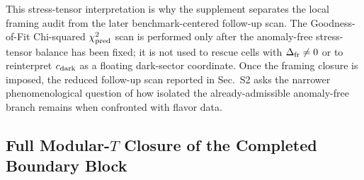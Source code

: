 \documentclass[11pt]{article}
\begin{document}
This stress-tensor interpretation is why the supplement separates the local framing audit from the later benchmark-centered follow-up scan. The Goodness-of-Fit Chi-squared $\chi^2_{\rm pred}$ scan is performed only after the anomaly-free stress-tensor balance has been fixed; it is not used to rescue cells with $\Delta_{\rm fr}\neq0$ or to reinterpret $c_{\rm dark}$ as a floating dark-sector coordinate. Once the framing closure is imposed, the reduced follow-up scan reported in Sec.~S2 asks the narrower phenomenological question of how isolated the already-admissible anomaly-free branch remains when confronted with flavor data.

\subsection{Full Modular-$T$ Closure of the Completed Boundary Block}
\label{supp-sec:full-t-closure}
\end{document}
